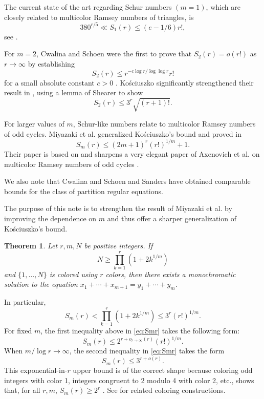 \documentclass[10pt,a4paper]{amsart}
\newtheorem{theorem}{Theorem}
\begin{document}
The current state of the art regarding Schur numbers $(m=1)$, which are closely related to multicolor Ramsey numbers of triangles, is
\[
380^{r/5} \ll S_1(r) \leq (e - 1/6)r!,
\]
see \cite{Abbott-Hanson1972, ACPPRT2022, Eliahou2020, Exoo1994, Fredricksen-Sweet2000, Wan1997, Whitehead1973, XXC2002}. 

For $m=2$, Cwalina and Schoen were the first to prove that $S_2(r) = o(r!)$ as $r\to\infty$ by establishing
\[
S_2(r) \le r^{-c \log r/ \log\log r} r!
\]
for a small absolute constant $c>0$ \cite{Cwalina-Schoen2017}. Ko\'sciuszko significantly strengthened their result in \cite{Kosciuszko2025}, using a lemma of Shearer \cite{Shearer1995} to show
\[
S_2(r) \le 3^r \sqrt{(r + 1)!}.
\]

For larger values of $m$, Schur-like numbers relate to multicolor Ramsey numbers of odd cycles. Miyazaki et al. generalized Ko\'sciuszko's bound and proved in \cite{MMPZ2026}
\[
S_m(r) \le (2m + 1)^r(r!)^{1/m} + 1.
\]
Their paper is based on and sharpens a very elegant paper of Axenovich et al. on multicolor Ramsey numbers of odd cycles \cite{ACJMR2026}.

We also note that Cwalina and Schoen \cite{Cwalina-Schoen2017} and Sanders \cite{Sanders2026a} have obtained comparable bounds for the class of partition regular equations.  

The purpose of this note is to strengthen the result of Miyazaki et al. by improving the dependence on $m$ and thus offer a sharper generalization of Ko\'sciuszko's bound. 



\begin{theorem} \label{thm:schurlike}
    Let $r, m, N$ be positive integers. If 
    \[
    N \ge \prod_{k=1}^r (1 + 2 k^{1/m})
    \]
    and $\{1, \dots, N\}$ is colored using $r$ colors, then there exists a monochromatic solution to the equation $x_1+\cdots+x_{m+1}=y_1+\cdots+y_m$.
\end{theorem}


In particular,
\begin{equation} \label{eq:Smr}
S_m(r) < \prod_{k=1}^r (1 + 2 k^{1/m}) \le 3^r (r!)^{1/m}.
\end{equation}
For fixed $m$, the first inequality above in \eqref{eq:Smr} takes the following form:
\[
S_m(r) \leq 2^{r + o_{r \to \infty}(r)} (r!)^{1/m}.
\]
When $m / \log r \to \infty$, the second inequality in \eqref{eq:Smr} takes the form
\[
S_m(r) \leq 3^{r+o(r)}.
\]
This exponential-in-$r$ upper bound is of the correct shape because coloring odd integers with color 1, integers congruent to 2 modulo 4 with color 2, etc., shows that, for all $r, m$, $S_m(r) \geq 2^r$ \cite{MMPZ2026}. See \cite{Fox-Kleitman2006} for related coloring constructions.
\end{document}

